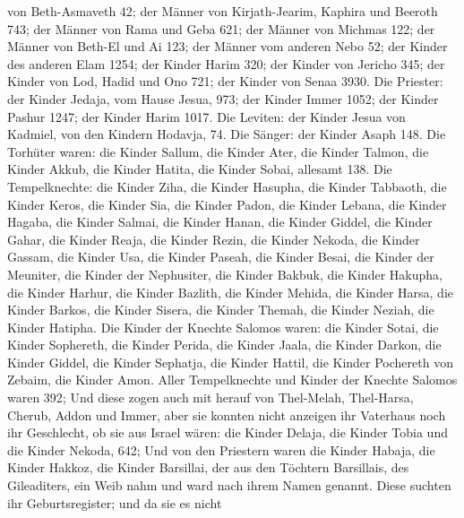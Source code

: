 von Beth-Asmaveth 42;  der Männer von Kirjath-Jearim,
Kaphira und Beeroth 743;  der Männer von Rama und Geba 621;
 der Männer von Michmas 122;  der Männer von
Beth-El und Ai 123;  der Männer vom anderen Nebo 52;
 der Kinder des anderen Elam 1254;  der Kinder
Harim 320;  der Kinder von Jericho 345;  der
Kinder von Lod, Hadid und Ono 721;  der Kinder von Senaa
3930.  Die Priester: der Kinder Jedaja, vom Hause Jesua,
973;  der Kinder Immer 1052;  der Kinder
Pashur 1247;  der Kinder Harim 1017.  Die
Leviten: der Kinder Jesua von Kadmiel, von den Kindern Hodavja, 74.
 Die Sänger: der Kinder Asaph 148.  Die
Torhüter waren: die Kinder Sallum, die Kinder Ater, die Kinder Talmon,
die Kinder Akkub, die Kinder Hatita, die Kinder Sobai, allesamt 138.
 Die Tempelknechte: die Kinder Ziha, die Kinder Hasupha,
die Kinder Tabbaoth,  die Kinder Keros, die Kinder Sia, die
Kinder Padon,  die Kinder Lebana, die Kinder Hagaba, die
Kinder Salmai,  die Kinder Hanan, die Kinder Giddel, die
Kinder Gahar,  die Kinder Reaja, die Kinder Rezin, die
Kinder Nekoda,  die Kinder Gassam, die Kinder Usa, die
Kinder Paseah,  die Kinder Besai, die Kinder der Meuniter,
die Kinder der Nephusiter,  die Kinder Bakbuk, die Kinder
Hakupha, die Kinder Harhur,  die Kinder Bazlith, die Kinder
Mehida, die Kinder Harsa,  die Kinder Barkos, die Kinder
Sisera, die Kinder Themah,  die Kinder Neziah, die Kinder
Hatipha.  Die Kinder der Knechte Salomos waren: die Kinder
Sotai, die Kinder Sophereth, die Kinder Perida,  die Kinder
Jaala, die Kinder Darkon, die Kinder Giddel,  die Kinder
Sephatja, die Kinder Hattil, die Kinder Pochereth von Zebaim, die Kinder
Amon.  Aller Tempelknechte und Kinder der Knechte Salomos
waren 392;  Und diese zogen auch mit herauf von Thel-Melah,
Thel-Harsa, Cherub, Addon und Immer, aber sie konnten nicht anzeigen ihr
Vaterhaus noch ihr Geschlecht, ob sie aus Israel wären: 
die Kinder Delaja, die Kinder Tobia und die Kinder Nekoda, 642;
 Und von den Priestern waren die Kinder Habaja, die Kinder
Hakkoz, die Kinder Barsillai, der aus den Töchtern Barsillais, des
Gileaditers, ein Weib nahm und ward nach ihrem Namen genannt.
 Diese suchten ihr Geburtsregister; und da sie es nicht
